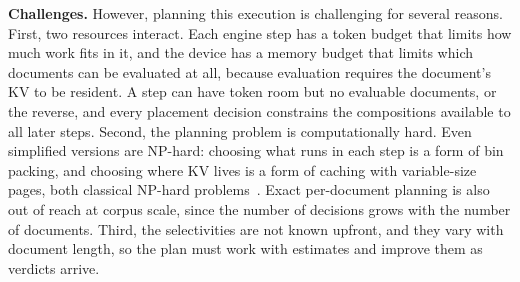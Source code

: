 \documentclass[10pt,twocolumn]{article}
\begin{document}
\textbf{Challenges.} However, planning this execution is challenging for several reasons. First, two resources interact. Each engine step has a token budget that limits how much work fits in it, and the device has a memory budget that limits which documents can be evaluated at all, because evaluation requires the document's KV to be resident. A step can have token room but no evaluable documents, or the reverse, and every placement decision constrains the compositions available to all later steps. Second, the planning problem is computationally hard. Even simplified versions are NP-hard: choosing what runs in each step is a form of bin packing, and choosing where KV lives is a form of caching with variable-size pages, both classical NP-hard problems~\cite{uzsoy,cachinghard}. Exact per-document planning is also out of reach at corpus scale, since the number of decisions grows with the number of documents. Third, the selectivities are not known upfront, and they vary with document length, so the plan must work with estimates and improve them as verdicts arrive.
\end{document}
